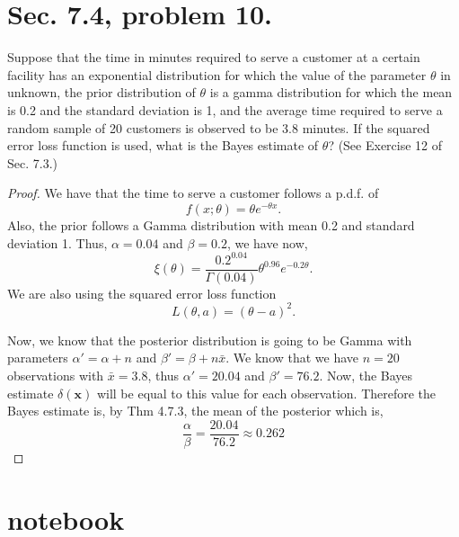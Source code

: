 \documentclass{article}
\newcommand{\pdf}{p.d.f. }
\newenvironment{hwproof}[1]
{
    #1
    \begin{proof}
}{
    \end{proof}
}
\begin{document}
\section{Sec. 7.4, problem 10.}
\begin{hwproof}
    {
        Suppose that the time in minutes required to serve a customer at a certain
        facility has an exponential distribution for which the value of the
        parameter $\theta$ in unknown, the prior distribution of $\theta$
        is a gamma distribution for which the mean is 0.2 and the standard
        deviation is 1, and the average time required to serve a random sample
        of 20 customers is observed to be 3.8 minutes. If the squared error loss
        function is used, what is the Bayes estimate of $\theta$?
        (See Exercise 12 of Sec. 7.3.)
    }

    We have that the time to serve a customer follows a \pdf of
    \begin{equation*}
        f(x;\theta) = \theta e^{-\theta x}.
    \end{equation*}
    Also, the prior follows a Gamma distribution with mean 0.2 and standard
    deviation 1. Thus, $\alpha = 0.04$ and $\beta = 0.2$, we have now,
    \begin{equation*}
        \xi(\theta) = \frac{0.2^{0.04}}{\Gamma(0.04)}\theta^{0.96} e^{-0.2\theta}.
    \end{equation*}
    We are also using the squared error loss function
    \begin{equation*}
        L(\theta, a) = (\theta - a)^2.
    \end{equation*}

    Now, we know that the posterior distribution is going to be Gamma with
    parameters $\alpha' = \alpha + n$ and $\beta'= \beta + n\bar{x}$.
    We know that we have $n=20$ observations with $\bar{x} = 3.8$, thus
    $\alpha' = 20.04$ and $\beta'=76.2$. Now, the Bayes estimate $\delta(\bm{x})$
    will be equal to this value for each observation. Therefore the Bayes estimate
    is, by Thm 4.7.3, the mean of the posterior which is,
    \begin{equation*}
        \frac{\alpha}{\beta} = \frac{20.04}{76.2} \approx 0.262
    \end{equation*}
\end{hwproof}
\section{notebook}
\end{document}
